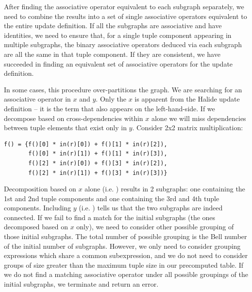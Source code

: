 After finding the associative operator equivalent to each subgraph separately, we need to combine the results into a set of single associative operators equivalent to the entire update definition. If all the subgraphs are associative and have identities, we need to ensure that, for a single tuple component appearing in multiple subgraphs, the binary associative operators deduced via each subgraph are all the same in that tuple component. If they are consistent, we have succeeded in finding an equivalent set of associative operators for the update definition.

In some cases, this procedure over-partitions the graph. We are searching for an associative operator in $x$ and $y$. Only the $x$ is apparent from the Halide update definition -- it is the term that also appears on the left-hand-side. If we decompose based on cross-dependencies within $x$ alone we will miss dependencies between tuple elements that exist only in $y$. Consider 2x2 matrix multiplication:

\begin{lstlisting}[caption={2x2 matrix multiplication. The four tuple components are the components in a 2x2 matrix in row order.}]
f() = {f()[0] * in(r)[0]) + f()[1] * in(r)[2]),
       f()[0] * in(r)[1]) + f()[1] * in(r)[3]),
       f()[2] * in(r)[0]) + f()[3] * in(r)[2]),
       f()[2] * in(r)[1]) + f()[3] * in(r)[3])}
\end{lstlisting}

Decomposition based on $x$ alone (i.e. ) results in 2 subgraphs: one containing the 1st and 2nd tuple components and one containing the 3rd and 4th tuple components. Including $y$ (i.e. ) tells us that the two subgraphs are indeed connected. If we fail to find a match for the initial subgraphs (the ones decomposed based on $x$ only), we need to consider other possible grouping of those initial subgraphs. The total number of possible grouping is the Bell number of the initial number of subgraphs. However, we only need to consider grouping expressions which share a common subexpression, and we do not need to consider groups of size greater than the maximum tuple size in our precomputed table. If we do not find a matching associative operator under all possible groupings of the initial subgraphs, we terminate and return an error.

